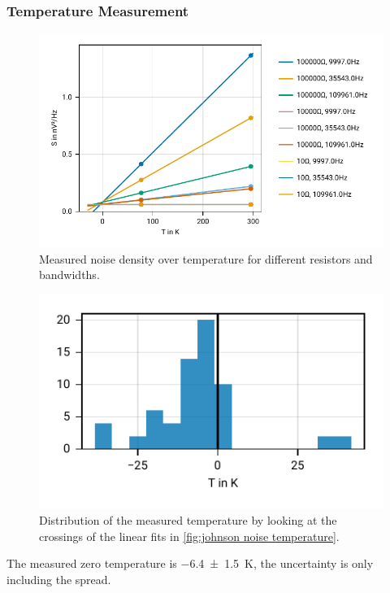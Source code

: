 \documentclass[
    parskip=half, 
    twoside=false,
    twocolumn=true,
    fontsize=11pt,
]{scrarticle}
\begin{document}
\subsubsection*{Temperature Measurement}
\begin{figure}[h!]
    \centering
    \includegraphics{figures/02 temperature.pdf}
    \caption{
        Measured noise density over temperature for different resistors and bandwidths.
    }
    \label{fig:johnson noise temperature}
\end{figure}
\begin{figure}[h!]
    \centering
    \includegraphics{figures/02 temperature distribution.pdf}
    \caption{
        Distribution of the measured temperature by looking at the crossings of the linear fits in \autoref{fig:johnson noise temperature}.
    }
    \label{fig:johnson noise temperature distribution}
\end{figure}
The measured zero temperature is \SI{-6.4(15)}{K}, the uncertainty is only including the spread.
\end{document}
